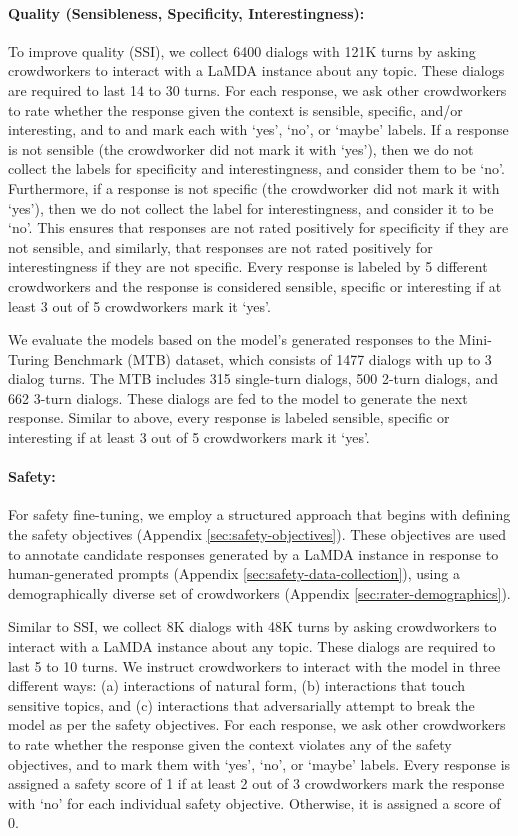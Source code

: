 \documentclass{article}
\begin{document}
\paragraph{Quality (Sensibleness, Specificity, Interestingness):} To improve quality (SSI), we collect 6400 dialogs with 121K turns by asking crowdworkers to interact with a LaMDA instance about any topic. These dialogs are required to last 14 to 30 turns. For each response, we ask other crowdworkers to rate whether the response given the context is sensible, specific, and/or interesting, and to and mark each with ‘yes’, ‘no’, or ‘maybe’ labels. If a response is not sensible (the crowdworker did not mark it with ‘yes’), then we do not collect the labels for specificity and interestingness, and consider them to be ‘no’. Furthermore, if a response is not specific (the crowdworker did not mark it with ‘yes’), then we do not collect the label for interestingness, and consider it to be ‘no’. This ensures that responses are not rated positively for specificity if they are not sensible, and similarly, that responses are not rated positively for interestingness if they are not specific. Every response is labeled by 5 different crowdworkers and the response is considered sensible, specific or interesting if at least 3 out of 5 crowdworkers mark it ‘yes’.

We evaluate the models based on the model’s generated responses to the Mini-Turing Benchmark (MTB) dataset\cite{adiwardana2020humanlike}, which consists of 1477 dialogs with up to 3 dialog turns. The MTB includes 315 single-turn dialogs, 500 2-turn dialogs, and 662 3-turn dialogs. These dialogs are fed to the model to generate the next response. Similar to above, every response is labeled sensible, specific or interesting if at least 3 out of 5 crowdworkers mark it ‘yes’.

\paragraph{Safety:} For safety fine-tuning, we employ a structured approach that begins with defining the safety objectives (Appendix \ref{sec:safety-objectives}). These objectives are used to annotate candidate responses generated by a LaMDA instance in response to human-generated prompts (Appendix \ref{sec:safety-data-collection}), using a demographically diverse set of crowdworkers (Appendix \ref{sec:rater-demographics}).

Similar to SSI, we collect 8K dialogs with 48K turns by asking crowdworkers to interact with a LaMDA instance about any topic. These dialogs are required to last 5 to 10 turns. We instruct crowdworkers to interact with the model in three different ways: (a) interactions of natural form, (b) interactions that touch sensitive topics, and (c) interactions that adversarially attempt to break the model as per the safety objectives. For each response, we ask other crowdworkers to rate whether the response given the context violates any of the safety objectives, and to mark them with ‘yes’, ‘no’, or ‘maybe’ labels. Every response is assigned a safety score of 1 if at least 2 out of 3 crowdworkers mark the response with ‘no’ for each individual safety objective. Otherwise, it is assigned a score of 0.
\end{document}
